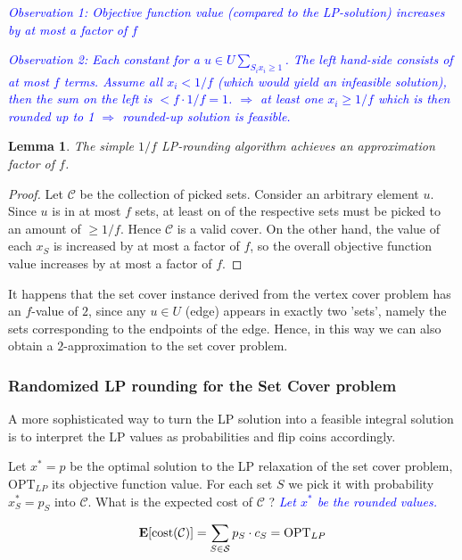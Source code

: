 \documentclass{article}
\newtheorem{lemma}{Lemma}
\begin{document}
\textcolor{blue}{\emph{\emph{Observation 1:} Objective function value (compared to the LP-solution) increases by at most a factor of $f$}}

\textcolor{blue}{\emph{\emph{Observation 2:} Each constant for a $u\in U \sum_{S_i{x_i \geq 1}}$. The left hand-side consists of at most $f$ terms. Assume all $x_i < 1/f$ (which would yield an infeasible solution), then the sum on the left is $ < f \cdot 1/f = 1$. $\Rightarrow$ at least one $x_i \geq 1/f$ which is then rounded up to 1 $\Rightarrow$ rounded-up solution is feasible.}}

\begin{lemma}
The simple $1/f$ LP-rounding algorithm achieves an approximation factor of $f$.
\end{lemma}
\begin{proof}
Let $\mathcal{C}$ be the collection of picked sets. Consider an arbitrary element $u$. Since $u$ is in at most $f$ sets,
at least on of the respective sets must be picked to an amount of $\geq 1/f$. Hence $\mathcal{C}$ is a valid cover.
On the other hand, the value of each $x_S$ is increased by at most a factor of $f$, so the overall objective function value
increases by at most a factor of $f$.
\end{proof}

It happens that the set cover instance derived from the vertex cover problem has an $f$-value of $2$, since any $u\in U$ (edge) appears in exactly two 'sets', namely the sets corresponding to the endpoints of the edge. Hence, in this way we can also obtain a $2$-approximation to the set cover problem.


\subsubsection{Randomized LP rounding for the Set Cover problem}
A more sophisticated way to turn the LP solution into a feasible integral solution is to interpret the LP values
as probabilities and flip coins accordingly.

Let $x^*=p$ be the optimal solution to the LP relaxation of the set cover problem, $\mathrm{OPT}_{LP}$ its objective function value.
For each set $S$ we pick it with probability $x^*_S=p_S$ into $\mathcal{C}$. What is the expected cost of $\mathcal{C}$ ? 
\textcolor{blue}{\emph{ Let $x^*$ be the rounded values.}}

\[
	{\bf E}[\mathrm{cost}(\mathcal{C})]=\sum_{S\in \mathcal{S}} p_S\cdot c_S=\mathrm{OPT}_{LP}
\]
\end{document}
